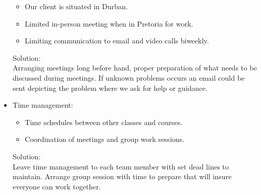 \documentclass[letterpaper]{article}
\begin{document}
\begin{itemize}
\begin{itemize}
					\item Our client is situated in Durban.
					\item Limited in-person meeting when in Pretoria for work.
					\item Limiting communication to email and video calls biweekly.
				\end{itemize}
				Solution: \\
				Arranging meetings long before hand, proper preparation of what needs to be discussed during meetings. If unknown problems occurs an email could be sent depicting the problem where we ask for help or guidance.
			\item Time management:
				\begin{itemize}
					\item Time schedules between other classes and courses.
					\item Coordination of meetings and group work sessions.
				\end{itemize}
				Solution: \\
				Leave time management to each team member with set dead lines to maintain. Arrange group session with time to prepare that will insure everyone can work together.
		\end{itemize}
		
\end{document}
